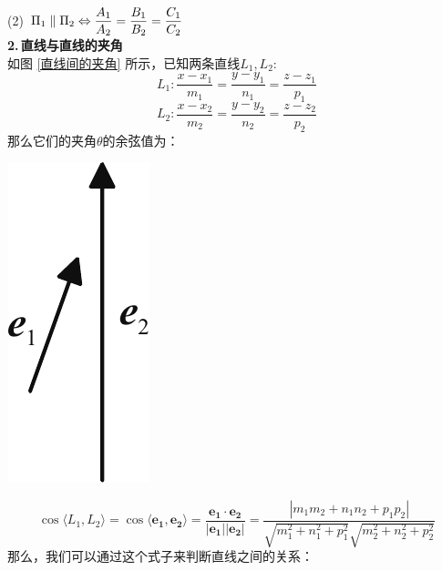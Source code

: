 \noindent
\begin{minipage}{0.7\linewidth}
\hspace*{2em}(2)$\hspace*{0.5em} \Pi_1\parallel \Pi_2 \Leftrightarrow \displaystyle \frac{A_1}{A_2}=\frac{B_1}{B_2}=\frac{C_1}{C_2} $\vspace*{-0.5em}\\

\textbf{2.$\,$直线与直线的夹角}\\
\hspace*{2em} 如图 \ref{直线间的夹角} 所示，已知两条直线$L_1,L_2$:
\begin{equation}
	L_1: \frac{x-x_1}{m_1}=\frac{y-y_1}{n_1}=\frac{z-z_1}{p_1}
\end{equation}
\begin{equation}
	L_2:\frac{x-x_2}{m_2}=\frac{y-y_2}{n_2}=\frac{z-z_2}{p_2}
\end{equation}
那么它们的夹角$\theta$的余弦值为：
\end{minipage}
\begin{minipage}{0.35\linewidth}
	\centering
	\includegraphics[width = 0.25\linewidth]{pic/C-5/lineang}
	\vspace*{-1em}
	\label{直线间的夹角}
\end{minipage}

\begin{equation}
\cos\langle L_1,L_2\rangle =\cos \langle \boldsymbol{e_1},\boldsymbol{e_2}\rangle =\frac{\boldsymbol{e_1}\cdot\boldsymbol{e_2}}{|\boldsymbol{e_1}||\boldsymbol{e_2}|}=\frac{|m_1m_2+n_1n_2+p_1p_2|}{\sqrt{m_1^2+n_1^2+p_1^2}\sqrt{m_2^2+n_2^2+p_2^2}}
\end{equation}
那么，我们可以通过这个式子来判断直线之间的关系：
\vspace*{1em}

